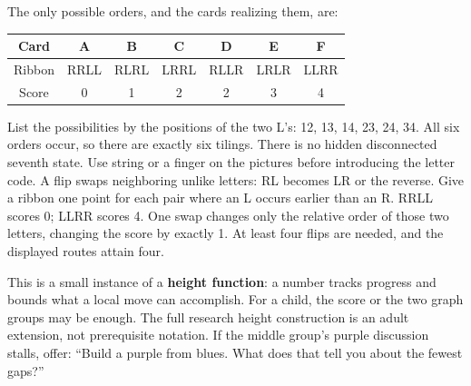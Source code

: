 \documentclass[11pt]{article}
\begin{document}
The only possible orders, and the cards realizing them, are:
\begin{center}\begin{tabular}{c|cccccc}
Card&A&B&C&D&E&F\\\hline
Ribbon&RRLL&RLRL&LRRL&RLLR&LRLR&LLRR\\
Score&0&1&2&2&3&4
\end{tabular}\end{center}
List the possibilities by the positions of the two L's: 12, 13, 14, 23, 24, 34. All six orders occur, so there are exactly six tilings. There is no hidden disconnected seventh state. Use string or a finger on the pictures before introducing the letter code.
A flip swaps neighboring unlike letters: RL becomes LR or the reverse. Give a ribbon one point for each pair where an L occurs earlier than an R. RRLL scores 0; LLRR scores 4. One swap changes only the relative order of those two letters, changing the score by exactly 1. At least four flips are needed, and the displayed routes attain four.

This is a small instance of a \textbf{height function}: a number tracks progress and bounds what a local move can accomplish. For a child, the score or the two graph groups may be enough. The full research height construction is an adult extension, not prerequisite notation.
If the middle group's purple discussion stalls, offer: ``Build a purple from blues. What does that tell you about the fewest gaps?''
\end{document}
